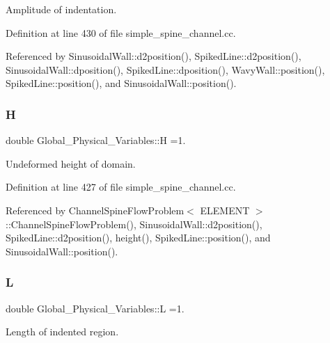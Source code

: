 Amplitude of indentation. 



Definition at line 430 of file simple\+\_\+spine\+\_\+channel.\+cc.



Referenced by Sinusoidal\+Wall\+::d2position(), Spiked\+Line\+::d2position(), Sinusoidal\+Wall\+::dposition(), Spiked\+Line\+::dposition(), Wavy\+Wall\+::position(), Spiked\+Line\+::position(), and Sinusoidal\+Wall\+::position().

\mbox{\label{namespaceGlobal__Physical__Variables_af6e07423e22c0991084d9a2f43727805}} 
\subsubsection{\texorpdfstring{H}{H}}
{\footnotesize\ttfamily double Global\+\_\+\+Physical\+\_\+\+Variables\+::H =1.}



Undeformed height of domain. 



Definition at line 427 of file simple\+\_\+spine\+\_\+channel.\+cc.



Referenced by Channel\+Spine\+Flow\+Problem$<$ E\+L\+E\+M\+E\+N\+T $>$\+::\+Channel\+Spine\+Flow\+Problem(), Sinusoidal\+Wall\+::d2position(), Spiked\+Line\+::d2position(), height(), Spiked\+Line\+::position(), and Sinusoidal\+Wall\+::position().

\mbox{\label{namespaceGlobal__Physical__Variables_a1b8bfc451f6b7ac89eca18f04338f47f}} 
\subsubsection{\texorpdfstring{L}{L}}
{\footnotesize\ttfamily double Global\+\_\+\+Physical\+\_\+\+Variables\+::L =1.}



Length of indented region. 



